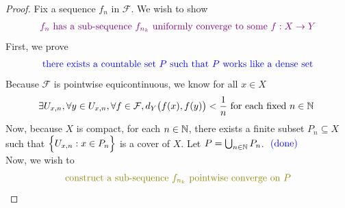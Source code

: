 \documentclass{report}
\begin{document}
\begin{proof}
Fix a sequence $f_n$ in $\mathcal{F}$. We wish to show
\begin{align*}
\textcolor{violet}{f_n\text{ has a sub-sequence $f_{n_k}$ uniformly converge to some }f:X\rightarrow Y}
\end{align*}
First, we prove 
\begin{align*}
\textcolor{blue}{\text{ there exists a countable set $P$ such that $P$ works like a dense set }}
\end{align*}
Because $\mathcal{F}$ is pointwise equicontinuous, we know for all $x \in X$ 
\begin{align*}
\exists U_{x,n}, \forall y \in U_{x,n},\forall f \in \mathcal{F}, d_Y\big(f(x),f(y) \big)<\frac{1}{n} \text{ for each fixed $n\in\mathbb{N}$ }
\end{align*}
Now, because $X$ is compact, for each $n\in\mathbb{N}$, there exists a finite subset $P_n\subseteq X$ such that $\Big\{ U_{x,n}:x \in P_n \Big\}$ is a cover of $X$. Let $P=\bigcup_{n\in\mathbb{N}}P_n$. $\textcolor{blue}{\text{ (done) }}$\\

Now, we wish to 
\begin{align*}
\olive{\text{ construct a sub-sequence $f_{n_k}$ pointwise converge on $P$ }}
\end{align*}


\end{proof}
\end{document}

